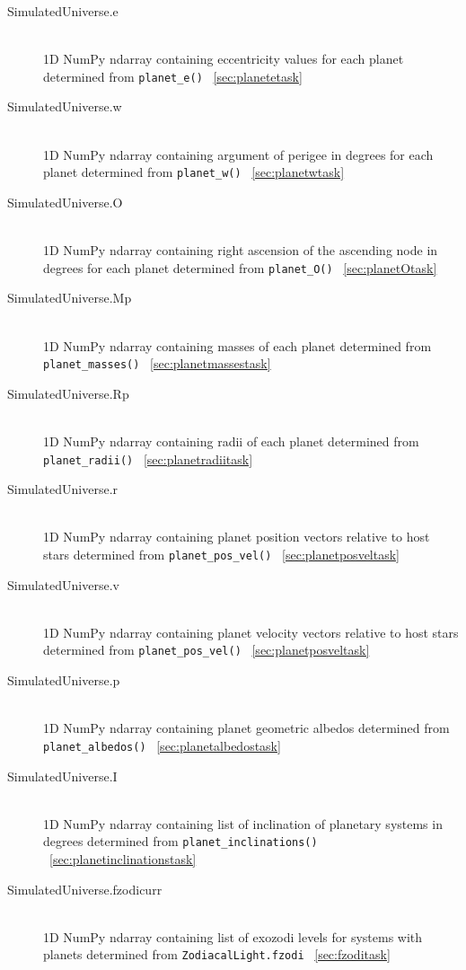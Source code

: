 \documentclass[cleanfoot]{asme2ej}
\begin{document}
\begin{itemize}
\begin{description}
        \item[SimulatedUniverse.e] \hfill \\
        1D NumPy ndarray containing eccentricity values for each planet determined from \verb+planet_e()+ ~\ref{sec:planetetask}
        \item[SimulatedUniverse.w] \hfill \\
        1D NumPy ndarray containing argument of perigee in degrees for each planet determined from \verb+planet_w()+ ~\ref{sec:planetwtask}
        \item[SimulatedUniverse.O] \hfill \\
        1D NumPy ndarray containing right ascension of the ascending node in degrees for each planet determined from \verb+planet_O()+ ~\ref{sec:planetOtask}
        \item[SimulatedUniverse.Mp] \hfill \\
        1D NumPy ndarray containing masses of each planet determined from \verb+planet_masses()+ ~\ref{sec:planetmassestask}
        \item[SimulatedUniverse.Rp] \hfill \\
        1D NumPy ndarray containing radii of each planet determined from \verb+planet_radii()+ ~\ref{sec:planetradiitask}
        \item[SimulatedUniverse.r] \hfill \\
        1D NumPy ndarray containing planet position vectors relative to host stars determined from \verb+planet_pos_vel()+ ~\ref{sec:planetposveltask}
        \item[SimulatedUniverse.v] \hfill \\
        1D NumPy ndarray containing planet velocity vectors relative to host stars determined from \verb+planet_pos_vel()+ ~\ref{sec:planetposveltask}
        \item[SimulatedUniverse.p] \hfill \\
        1D NumPy ndarray containing planet geometric albedos determined from \verb+planet_albedos()+ ~\ref{sec:planetalbedostask}
        \item[SimulatedUniverse.I] \hfill \\
        1D NumPy ndarray containing list of inclination of planetary systems in degrees determined from \verb+planet_inclinations()+ ~\ref{sec:planetinclinationstask}
        \item[SimulatedUniverse.fzodicurr] \hfill \\
        1D NumPy ndarray containing list of exozodi levels for systems with planets determined from \verb+ZodiacalLight.fzodi+ ~\ref{sec:fzoditask}
    \end{description}
\end{itemize}
\end{document}

